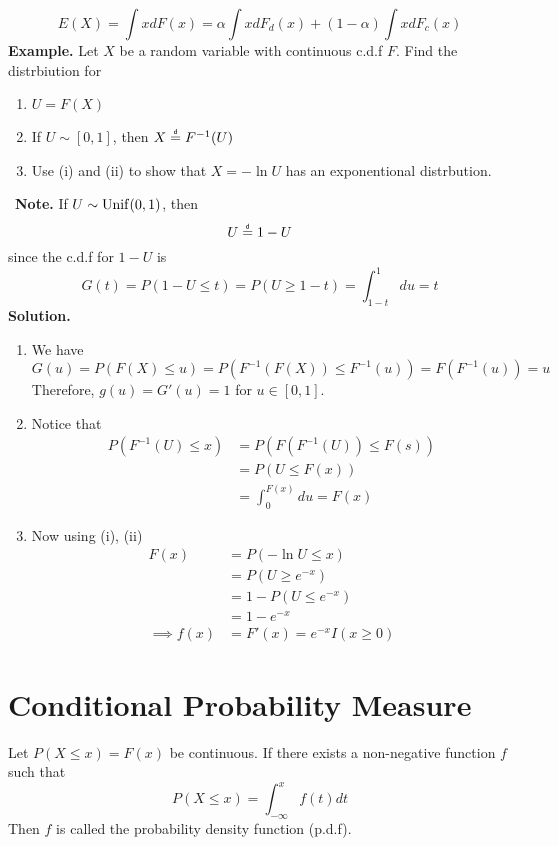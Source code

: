 \documentclass[openany]{report}
\begin{document}
\[E(X) = \int xdF(x) = \alpha \int x dF_d(x) + (1-\alpha)\int x dF_c(x)\]
\textbf{Example.} Let $X$ be a random variable with continuous c.d.f $F$. Find the distrbiution for 
\begin{enumerate}[label=(\roman*)]
    \item $U = F(X)$
    \item If $U \sim [0,1]$, then $X \eqd F^{-1}(U)$
    \item Use (i) and (ii) to show that $X = -\ln U$ has an exponentional distrbution. 
\end{enumerate}\
\textbf{Note.} If $U \sim \operatorname{Unif}(0,1)$, then 
\[U \eqd 1 - U\]
since the c.d.f for $1 - U$ is 
\[G(t) = P(1 - U \leq t) = P(U \geq 1 - t) = \int_{1-t}^1 du = t\]
\textbf{Solution.} 
\begin{enumerate}[label=(\roman*)]
    \item We have
    \[G(u) = P(F(X) \leq u) = P(F^{-1}(F(X)) \leq F^{-1}(u)) = F(F^{-1}(u)) = u\]
    Therefore, $g(u) = G'(u) = 1$ for $u \in [0,1]$.
    \item Notice that 
    \begin{align*}
        P(F^{-1}(U) \leq x) &= P(F(F^{-1}(U)) \leq F(s))\\
        &= P(U \leq F(x))\\
        &= \int_0^{F(x)} du = F(x)
    \end{align*}
    \item Now using (i), (ii)
    \begin{align*}
        F(x) &= P(-\ln U \leq x)\\
        &= P(U \geq e^{-x})\\
        &= 1 - P(U \leq e^{-x})\\
        &= 1 - e^{-x}\\
        \implies f(x) &= F'(x) = e^{-x}I(x \geq 0)
    \end{align*}    
\end{enumerate}



\section{Conditional Probability Measure}
\begin{definition}
    Let $P(X \leq x) = F(x)$ be continuous. If there exists a non-negative function $f$ such that 
    \[P(X \leq x) = \int_{-\infty}^x f(t)dt\]
    Then $f$ is called the probability density function (p.d.f). 
\end{definition}
\end{document}
